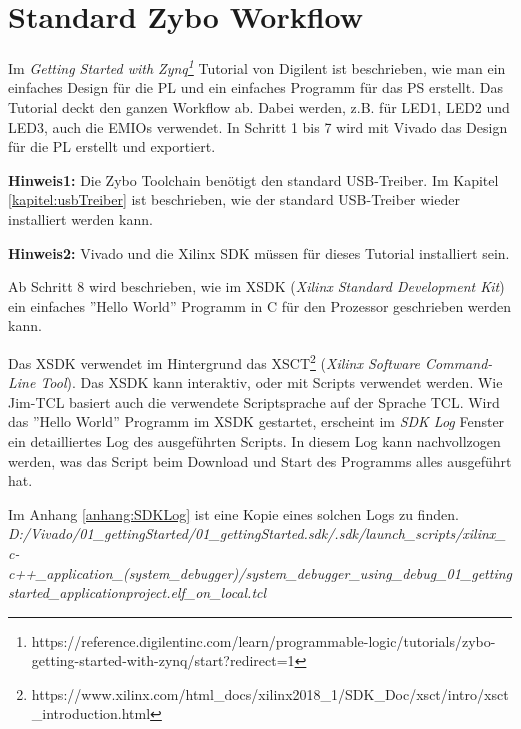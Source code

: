 
\section{Standard Zybo Workflow}
Im \textit{Getting Started with Zynq\footnote{https://reference.digilentinc.com/learn/programmable-logic/tutorials/zybo-getting-started-with-zynq/start?redirect=1}} Tutorial von Digilent ist beschrieben, wie man ein einfaches Design für die PL und ein einfaches Programm für das PS erstellt.
Das Tutorial deckt den ganzen Workflow ab.
Dabei werden, z.B. für LED1, LED2 und LED3, auch die EMIOs verwendet.
In Schritt 1 bis 7 wird mit Vivado das Design für die PL erstellt und exportiert.

\textbf{Hinweis1:} Die Zybo Toolchain benötigt den standard USB-Treiber. Im Kapitel \ref{kapitel:usbTreiber} ist beschrieben, wie der standard USB-Treiber wieder installiert werden kann.

\textbf{Hinweis2:} Vivado und die Xilinx SDK müssen für dieses Tutorial installiert sein.

Ab Schritt 8 wird beschrieben, wie im XSDK (\textit{Xilinx Standard Development Kit}) ein einfaches ''Hello World'' Programm in C für den Prozessor geschrieben werden kann.

Das XSDK verwendet im Hintergrund das XSCT\footnote{https://www.xilinx.com/html\_docs/xilinx2018\_1/SDK\_Doc/xsct/intro/xsct\_introduction.html} (\textit{Xilinx Software Command-Line Tool}).
Das XSDK kann interaktiv, oder mit Scripts verwendet werden.
Wie Jim-TCL basiert auch die verwendete Scriptsprache auf der Sprache TCL.
Wird das ''Hello World'' Programm im XSDK gestartet, erscheint im \textit{SDK Log} Fenster ein detailliertes Log des ausgeführten Scripts.
In diesem Log kann nachvollzogen werden, was das Script beim Download und Start des Programms alles ausgeführt hat.

Im Anhang \ref{anhang:SDKLog} ist eine Kopie eines solchen Logs zu finden.
\textit{D:/Vivado/01\_gettingStarted/01\_gettingStarted.sdk/.sdk/launch\_scripts/xilinx\_c-c++\_application\_(system\_debugger)/system\_debugger\_using\_debug\_01\_gettingstarted\_applicationproject.elf\_on\_local.tcl}

